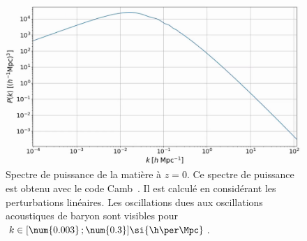 \begin{figure}
  \centering
  \includegraphics[scale=0.37]{pk_camb}
  \caption{Spectre de puissance de la matière à $z = 0$. Ce spectre de puissance est obtenu avec le code Camb~\autocite{Lewis1999}. Il est calculé en considérant les perturbations linéaires. Les oscillations dues aux oscillations acoustiques de baryon sont visibles pour $k \in [\num{0.003} \,; \num{0.3}] \si{\h\per\Mpc}$.}
  \label{fig:pk_camb}
\end{figure}
